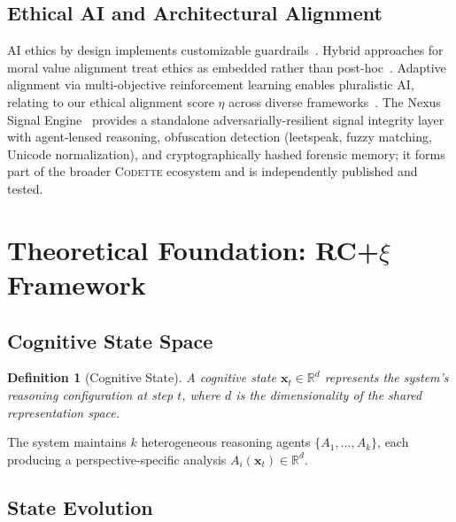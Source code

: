 \documentclass[11pt,a4paper]{article}
\newcommand{\rcxi}{RC+$\xi$}
\newcommand{\codette}{\textsc{Codette}}
\newtheorem{definition}{Definition}
\begin{document}
\subsection{Ethical AI and Architectural Alignment}
AI ethics by design implements customizable
guardrails~\citep{sekrst2024ethics}. Hybrid approaches for moral value
alignment treat ethics as embedded rather than post-hoc~\citep{tennant2023hybrid}.
Adaptive alignment via multi-objective reinforcement learning enables
pluralistic AI, relating to our ethical alignment score $\eta$ across diverse
frameworks~\citep{harland2024adaptive}. The Nexus Signal Engine~\citep{harrison2025nexussignal}
provides a standalone adversarially-resilient signal integrity layer with agent-lensed
reasoning, obfuscation detection (leetspeak, fuzzy matching, Unicode normalization),
and cryptographically hashed forensic memory; it forms part of the broader
\codette{} ecosystem and is independently published and tested.

\section{Theoretical Foundation: \rcxi{} Framework}
\label{sec:theory}

\subsection{Cognitive State Space}

\begin{definition}[Cognitive State]
A cognitive state $\mathbf{x}_t \in \mathbb{R}^d$ represents the system's
reasoning configuration at step $t$, where $d$ is the dimensionality of the
shared representation space.
\end{definition}

The system maintains $k$ heterogeneous reasoning agents
$\{A_1, \ldots, A_k\}$, each producing a perspective-specific analysis
$A_i(\mathbf{x}_t) \in \mathbb{R}^d$.

\subsection{State Evolution}
\end{document}
